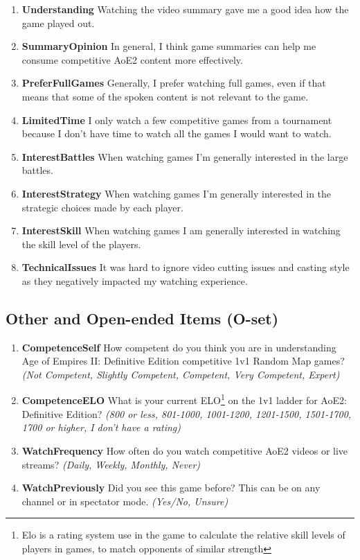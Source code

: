 \begin{enumerate}[label={G\arabic*}]
  \item \textbf{Understanding} Watching the video summary gave me a good idea how the game played out.
  \item \textbf{SummaryOpinion} In general, I think game summaries can help me consume competitive AoE2 content more effectively.
  \item \textbf{PreferFullGames} Generally, I prefer watching full games, even if that means that some of the spoken content is not relevant to the game.
  \item \textbf{LimitedTime} I only watch a few competitive games from a tournament because I don't have time to watch all the games I would want to watch.
  \item \textbf{InterestBattles} When watching games I'm generally interested in the large battles.
  \item \textbf{InterestStrategy} When watching games I'm generally interested in the strategic choices made by each player.
  \item \textbf{InterestSkill} When watching games I am generally interested in watching the skill level of the players.
  \item \textbf{TechnicalIssues} It was hard to ignore video cutting issues and casting style as they negatively impacted my watching experience.
\end{enumerate}

\subsection{Other and Open-ended Items (O-set)}
\begin{enumerate}[label={O\arabic*}]
  \item \textbf{CompetenceSelf} How competent do you think you are in understanding Age of Empires II: Definitive Edition competitive 1v1 Random Map games?  \textit{(Not Competent, Slightly Competent, Competent, Very Competent, Expert)}
  \item \textbf{CompetenceELO} What is your current ELO\footnote{Elo is a rating system use in the game to calculate the relative skill levels of players in games, to match opponents of similar strength} on the 1v1 ladder for AoE2: Definitive Edition?  \textit{(800 or less, 801-1000, 1001-1200, 1201-1500, 1501-1700, 1700 or higher, I don't have a rating)}
  \item \textbf{WatchFrequency} How often do you watch competitive AoE2 videos or live streams?  \textit{(Daily, Weekly, Monthly, Never)}
  \item \textbf{WatchPreviously} Did you see this game before? This can be on any channel or in spectator mode. \textit{(Yes/No, Unsure)}
\end{enumerate}

